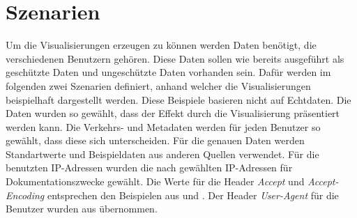 \documentclass[
    fontsize=12pt,
    headings=small,
    parskip=half,           %
    bibliography=totoc,
    numbers=noenddot,       %
    open=any,               %
    ]{scrreprt}
\begin{document}
\chapter{Szenarien} \label{Kap:Szenarios}

Um die Visualisierungen erzeugen zu können werden Daten benötigt, die verschiedenen Benutzern gehören.
Diese Daten sollen wie bereits ausgeführt als geschützte Daten und ungeschützte Daten vorhanden sein. 
Dafür werden im folgenden zwei Szenarien definiert, anhand welcher die Visualisierungen beispielhaft dargestellt werden. 
Diese Beispiele basieren nicht auf Echtdaten.
Die Daten wurden so gewählt, dass der Effekt durch die Visualisierung präsentiert werden kann.
Die Verkehrs- und Metadaten werden für jeden Benutzer so gewählt, dass diese sich unterscheiden. 
Für die genauen Daten werden Standartwerte und Beispieldaten aus anderen Quellen verwendet. 
Für die benutzten IP-Adressen wurden die nach \cite{RFC5737} gewählten IP-Adressen für Dokumentationszwecke gewählt.
Die Werte für die Header \textit{Accept} und \textit{Accept-Encoding} entsprechen den Beispielen aus \cite[sec. 5.3.2]{RFC7231} und \cite[sec. 5.3.4]{RFC7231}.
Der Header \textit{User-Agent} für die Benutzer wurden aus \cite{MDN} übernommen.
\end{document}

